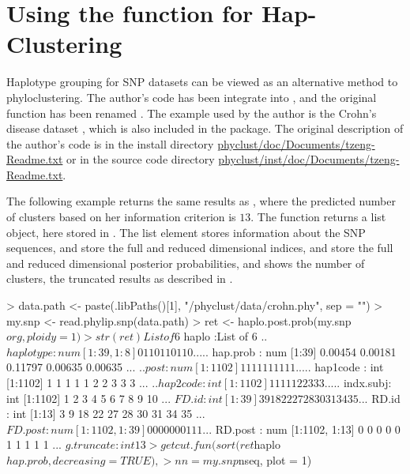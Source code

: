 \section[Using the haplo.post.prob() function for Hap-Clustering]{Using the  function for Hap-Clustering}
\label{sec:haplo}

Haplotype grouping \citep{tzeng2005} for SNP datasets
can be viewed as an alternative method to phyloclustering.
The author's  code has been integrate into ,
and the original function has been renamed .
The example used by the author is the Crohn's disease dataset
\citep{Hugot2001}, which is also included in the  package.
The original description of the author's  code is in the
install directory 
\url{phyclust/doc/Documents/tzeng-Readme.txt} or in the source code directory
\url{phyclust/inst/doc/Documents/tzeng-Readme.txt}.

The following example returns the same results as \cite{tzeng2005}, where
the predicted number of clusters based on her information criterion is $13$.
The function returns a list object, here stored in .
The list element  stores information about the SNP sequences,
 and  store the full and reduced dimensional
indices, 
 and  store the full and reduced dimensional
posterior probabilities, and  shows
the number of clusters,
the truncated results as described in \cite{tzeng2005}.
\begin{Code}
> data.path <- paste(.libPaths()[1], "/phyclust/data/crohn.phy", sep = "")
> my.snp <- read.phylip.snp(data.path)
> ret <- haplo.post.prob(my.snp$org, ploidy = 1)
> str(ret)
List of 6
 $ haplo     :List of 6
  ..$ haplotype: num [1:39, 1:8] 0 1 1 0 1 1 0 1 1 0 ...
  ..$ hap.prob : num [1:39] 0.00454 0.00181 0.11797 0.00635 0.00635 ...
  ..$ post     : num [1:1102] 1 1 1 1 1 1 1 1 1 1 ...
  ..$ hap1code : int [1:1102] 1 1 1 1 1 2 2 3 3 3 ...
  ..$ hap2code : int [1:1102] 1 1 1 1 1 2 2 3 3 3 ...
  ..$ indx.subj: int [1:1102] 1 2 3 4 5 6 7 8 9 10 ...
 $ FD.id     : int [1:39] 3 9 18 22 27 28 30 31 34 35 ...
 $ RD.id     : int [1:13] 3 9 18 22 27 28 30 31 34 35 ...
 $ FD.post   : num [1:1102, 1:39] 0 0 0 0 0 0 0 1 1 1 ...
 $ RD.post   : num [1:1102, 1:13] 0 0 0 0 0 1 1 1 1 1 ...
 $ g.truncate: int 13
> getcut.fun(sort(ret$haplo$hap.prob, decreasing = TRUE),
>            nn = my.snp$nseq, plot = 1)
\end{Code}

